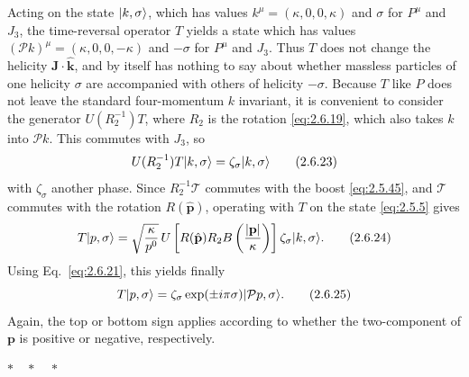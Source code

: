 Acting on the state $\lvert k,\sigma\rangle$, which has values
$k^\mu=(\kappa,0,0,\kappa)$ and $\sigma$ for $P^\mu$ and $J_3$, the
time-reversal operator $T$ yields a state which has values
$(\mathcal{P}k)^\mu=(\kappa,0,0,-\kappa)$ and $-\sigma$ for $P^\mu$ and $J_3$.
Thus $T$ does not change the helicity $\mathbf{J}\cdot\hat{\mathbf{k}}$, and
by itself has nothing to say about whether massless particles of one helicity
$\sigma$ are accompanied with others of helicity $-\sigma$. Because $T$ like
$P$ does not leave the standard four-momentum $k$ invariant, it is convenient
to consider the generator $U(R_2^{-1})T$, where $R_2$ is the rotation
\eqref{eq:2.6.19}, which also takes $k$ into $\mathcal{P}k$. This commutes with $J_3$,
so
\begin{equation}
U(R_2^{-1})T\lvert k,\sigma\rangle=\zeta_\sigma\lvert k,\sigma\rangle
\tag{2.6.23}\label{eq:2.6.23}
\end{equation}
with $\zeta_\sigma$ another phase. Since $R_2^{-1}\mathcal{T}$ commutes with
the boost \eqref{eq:2.5.45}, and $\mathcal{T}$ commutes with the rotation
$R(\hat{\mathbf{p}})$, operating with $T$ on the state \eqref{eq:2.5.5} gives
\begin{equation}
T\lvert p,\sigma\rangle
=\sqrt{\frac{\kappa}{p^0}}\,
U\left[R(\hat{\mathbf{p}})R_2B\left(\frac{|\mathbf{p}|}{\kappa}\right)\right]
\zeta_\sigma\lvert k,\sigma\rangle.
\tag{2.6.24}\label{eq:2.6.24}
\end{equation}
Using Eq.~\eqref{eq:2.6.21}, this yields finally
\begin{equation}
T\lvert p,\sigma\rangle
=\zeta_\sigma\exp(\pm i\pi\sigma)\lvert \mathcal{P}p,\sigma\rangle.
\tag{2.6.25}\label{eq:2.6.25}
\end{equation}
Again, the top or bottom sign applies according to whether the two-component
of $\mathbf{p}$ is positive or negative, respectively.

\begin{center}
$*\quad *\quad *$
\end{center}

